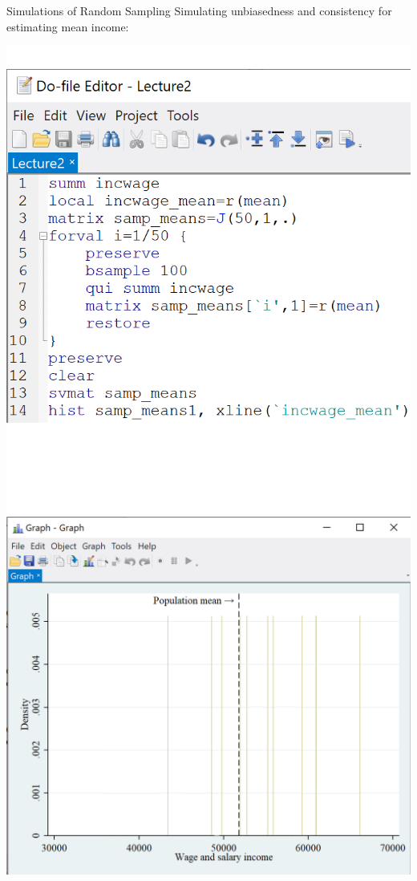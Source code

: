 \documentclass[11pt,english,handout]{beamer}
\begin{document}
\begin{frame}{Simulations of Random Sampling}
\vspace{0.2cm}
Simulating unbiasedness and consistency for estimating mean income:

\begin{center}
\includegraphics[scale=0.45]{stata18.png} \includegraphics[scale=0.5]{stata20.png}
\end{center}

\end{frame}
\end{document}
